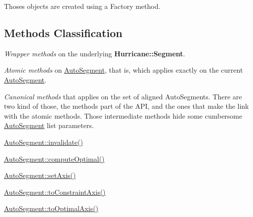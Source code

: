 Thoses objects are created using a Factory method.\hypertarget{classKatabatic_1_1AutoSegment_secASMethodsClassif}{}\subsection{Methods Classification}\label{classKatabatic_1_1AutoSegment_secASMethodsClassif}

\begin{DoxyItemize}
\item {\itshape Wrapper methods} on the underlying {\bf Hurricane\-::\-Segment}. 
\end{DoxyItemize}
\begin{DoxyItemize}
\item {\itshape Atomic methods} on \hyperlink{classKatabatic_1_1AutoSegment}{Auto\-Segment}, that is, which applies exactly on the current \hyperlink{classKatabatic_1_1AutoSegment}{Auto\-Segment}. 
\end{DoxyItemize}
\begin{DoxyItemize}
\item {\itshape Canonical methods} that applies on the set of aligned Auto\-Segments. There are two kind of those, the methods part of the A\-P\-I, and the ones that make the link with the atomic methods. Those intermediate methods hide some cumbersome \hyperlink{classKatabatic_1_1AutoSegment}{Auto\-Segment} list parameters. 
\begin{DoxyItemize}
\item \hyperlink{classKatabatic_1_1AutoSegment_a23599eee5a07af377fbc8d47cda7e7b0}{Auto\-Segment\-::invalidate()} 
\item \hyperlink{classKatabatic_1_1AutoSegment_a7654ca2b0787b8a9eac8629bf9218761}{Auto\-Segment\-::compute\-Optimal()} 
\item \hyperlink{classKatabatic_1_1AutoSegment_a3881efebb7510d9b22e5f89bcd418954}{Auto\-Segment\-::set\-Axis()} 
\item \hyperlink{classKatabatic_1_1AutoSegment_a8ab41a962e18810808f4f065863b5a73}{Auto\-Segment\-::to\-Constraint\-Axis()} 
\item \hyperlink{classKatabatic_1_1AutoSegment_a750983d7154c94b54537127a3a18e14b}{Auto\-Segment\-::to\-Optimal\-Axis()} 
\end{DoxyItemize}
\end{DoxyItemize}

